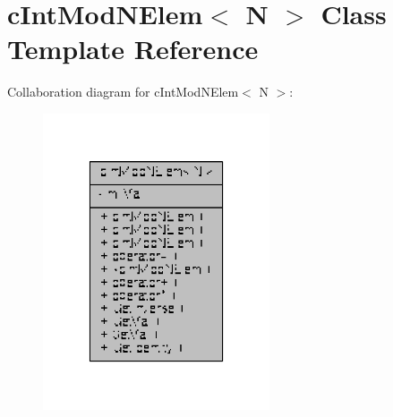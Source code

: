 \hypertarget{classcIntModNElem}{\section{c\-Int\-Mod\-N\-Elem$<$ N $>$ Class Template Reference}
\label{classcIntModNElem}
}


Collaboration diagram for c\-Int\-Mod\-N\-Elem$<$ N $>$\-:
\nopagebreak
\begin{figure}[H]
\begin{center}
\leavevmode
\includegraphics[width=190pt]{classcIntModNElem__coll__graph}
\end{center}
\end{figure}
